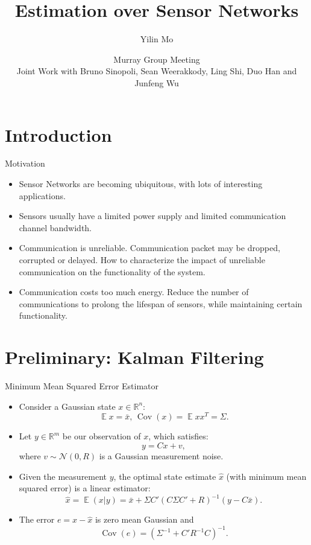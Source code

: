 \documentclass{beamer}
\title[Estm over SN]{Estimation over Sensor Networks}
\author[Yilin Mo]{Yilin Mo}
\institute[Caltech]{
Control and Dynamical Systems\\ California Institue of Technology 
}
\date[Aug 8, 2013]{Murray Group Meeting\\ \vspace{1cm}
\small Joint Work with Bruno Sinopoli, Sean Weerakkody, Ling Shi, Duo Han and Junfeng Wu}
\DeclareMathOperator{\Cov}{Cov}
\DeclareMathOperator{\E}{\mathbb E}
\begin{document}
\begin{frame}
  \titlepage
\end{frame}

\section{Introduction}
\begin{frame}{Motivation}
  \begin{itemize}
    \item Sensor Networks are becoming ubiquitous, with lots of interesting applications.
    \item Sensors usually have a limited power supply and limited communication channel bandwidth.
    \item Communication is unreliable. Communication packet may be dropped, corrupted or delayed. How to characterize the impact of unreliable communication on the functionality of the system.
    \item Communication costs too much energy. Reduce the number of communications to prolong the lifespan of sensors, while maintaining certain functionality. 
  \end{itemize}
\end{frame}

\section{Preliminary: Kalman Filtering}
\frame{\tableofcontents}
\begin{frame}{Minimum Mean Squared Error Estimator}
  \begin{itemize}
    \item Consider a Gaussian state $x\in \mathbb R^n$:
      \begin{displaymath}
	\E x = \bar x,\,\Cov(x) = \E xx^T = \Sigma.
      \end{displaymath}
    \item Let $y\in\mathbb R^m$ be our observation of $x$, which satisfies:
      \begin{displaymath}
	y = C x + v,
      \end{displaymath}
      where $v\sim \mathcal N(0,R)$ is a Gaussian measurement noise. 
    \item Given the measurement $y$, the optimal state estimate $\hat x$ (with minimum mean squared error) is a linear estimator:
      \begin{displaymath}
	\hat x = \E (x|y) = \bar x + \Sigma C'(C\Sigma C'+R)^{-1}(y-C\bar x).
      \end{displaymath}
    \item The error $e = x - \hat x$ is zero mean Gaussian and
      \begin{displaymath}
	\Cov(e) = (\Sigma^{-1} +  C'  R^{-1}C)^{-1}.
      \end{displaymath}
  \end{itemize}
\end{frame}
\end{document}
